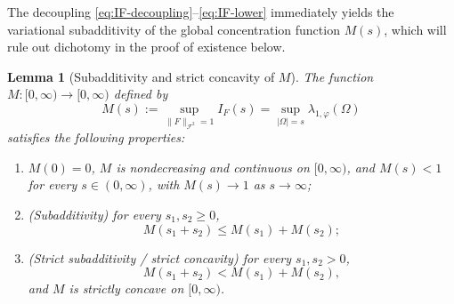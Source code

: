 \documentclass[a4paper,11pt,reqno]{amsart}
\numberwithin{equation}{section}
\theoremstyle{plain} %
\newtheorem{lemma}{Lemma}[section]
\theoremstyle{definition} %
\theoremstyle{remark}
\begin{document}
The decoupling \eqref{eq:IF-decoupling}--\eqref{eq:IF-lower} immediately
yields the variational subadditivity of the global concentration
function \(M(s)\), which will rule out dichotomy in the proof of
existence below.

\begin{lemma}[Subadditivity and strict concavity of \(M\)]\label{lem:M-subadditive}
The function \(M:[0,\infty)\to[0,\infty)\) defined by
\[
M(s):=\sup_{\|F\|_{\mathcal F^2}=1} I_F(s)
=\sup_{|\Omega|=s}\lambda_{1,\varphi}(\Omega)
\]
satisfies the following properties:
\begin{enumerate}
    \item[(i)] \(M(0)=0\), \(M\) is nondecreasing and continuous on
    \([0,\infty)\), and \(M(s)<1\) for every \(s\in(0,\infty)\), with
    \(M(s)\to 1\) as \(s\to\infty\);
    \item[(ii)] (\emph{Subadditivity}) for every \(s_1,s_2\ge 0\),
    \begin{equation}\label{eq:M-subadditivity}
    M(s_1+s_2)\le M(s_1)+M(s_2);
    \end{equation}
    \item[(iii)] (\emph{Strict subadditivity / strict concavity}) for
    every \(s_1,s_2>0\),
    \begin{equation}\label{eq:M-strict-subadditivity}
    M(s_1+s_2)<M(s_1)+M(s_2),
    \end{equation}
    and \(M\) is strictly concave on \([0,\infty)\).
\end{enumerate}
\end{lemma}
\end{document}
